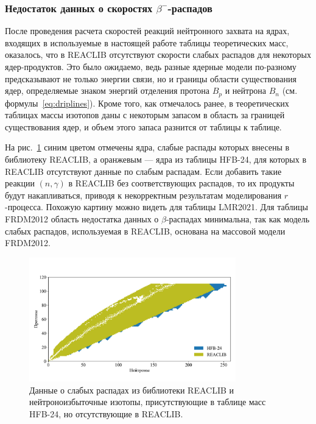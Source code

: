 \subsubsection{Недостаток данных о скоростях $\beta^-$-распадов}
  После проведения расчета скоростей реакций нейтронного захвата на ядрах, входящих в используемые в настоящей работе таблицы теоретических масс, оказалось, что в REACLIB отсутствуют скорости слабых распадов для некоторых ядер-продуктов.  Это было ожидаемо, ведь разные ядерные модели по-разному предсказывают не только энергии связи, но и границы области существования ядер, определяемые знаком энергий отделения протона $B_p$ и нейтрона $B_n$ (см. формулы~\ref{eq:driplines}). Кроме того, как отмечалось ранее, в теоретических таблицах массы изотопов даны с некоторым запасом в область за границей существования ядер, и объем этого запаса разнится от таблицы к таблице. 

  На рис.~\ref{img:weak_comparison} синим цветом отмечены ядра, слабые распады которых внесены в библиотеку REACLIB, а оранжевым --- ядра из таблицы HFB-24, для которых в REACLIB отсутствуют данные по слабым распадам. Если добавить такие реакции $(n,\gamma)$ в REACLIB без соответствующих распадов, то их продукты будут накапливаться, приводя к некорректным результатам моделирования $r$-процесса. Похожую картину можно видеть для таблицы LMR2021. Для таблицы FRDM2012 область недостатка данных о $\beta$-распадах минимальна, так как модель слабых распадов, используемая в REACLIB, основана на массовой модели FRDM2012.
  

\begin{figure}
  \centering
  \includegraphics[width=0.8\textwidth]{../pics/hfb_vs_reaclib.pdf}
  \caption{Данные о слабых распадах из библиотеки REACLIB и нейтроноизбыточные изотопы, присутствующие в таблице масс HFB-24, но отсутствующие в REACLIB.}
  \label{img:weak_comparison}
\end{figure}

